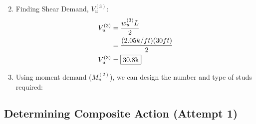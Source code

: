 \documentclass{report} %
\begin{document}
\begin{enumerate}
\begin{equation*}
        \end{equation*}
    \item Finding Shear Demand, $V^{(3)}_u$:
        \begin{equation*}
            \begin{aligned}
                V^{(3)}_u   &= \frac{{w^{(3)}_u}L}{2} \\
                            &= \frac{(2.05k/ft)(30ft)}{2} \\
                V^{(3)}_u   &= \framebox{30.8k}
            \end{aligned}
        \end{equation*}
    \item Using moment demand ($M^{(2)}_u$), we can design the number and type of studs required:
\end{enumerate}
\subsection*{Determining Composite Action (Attempt 1)}
\end{document}
